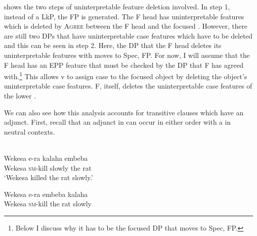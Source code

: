 \documentclass[output=paper,newtxmath,modfonts,nonflat,hidelinks]{langsci/langscibook}
\begin{document}
 shows the two steps of uninterpretable feature deletion involved. In step 1, instead of a LkP, the FP is generated. The F head has uninterpretable  features which is deleted by \textsc{Agree} between the F head and the focused . However, there are still two DPs that have uninterpretable case features which have to be deleted and this can be seen in step 2. Here, the DP that the F head deletes its uninterpretable  features with moves to Spec, FP. For now, I will assume that the F head has an EPP feature that must be checked by the DP that F has agreed with.\footnote{Below I discuss why it has to be the focused DP that moves to Spec, FP.} This allows v to assign case to the focused object by deleting the object’s uninterpretable case features. F, itself, deletes the uninterpretable case features of the lower . 

We can also see how this analysis accounts for transitive clauses which have an adjunct. First, recall that an adjunct in  can occur in either order with a  in neutral contexts.

\ea\label{ex:selvanathan:13}
\\
\ea\label{ex:selvanathan:13a}
{\gll Wekesa  e-ra     kalaha   embeba  \\
Wekesa   \textsc{sm}{}-kill   slowly    {the rat} \\}
\glt `Wekesa killed the rat slowly.'

\ex\label{ex:selvanathan:13b}
{\gll Wekesa  e-ra     embeba  kalaha   \\
Wekesa   \textsc{sm}{}-kill   {the rat}    slowly \\}
\z
\z
  
\end{document}
